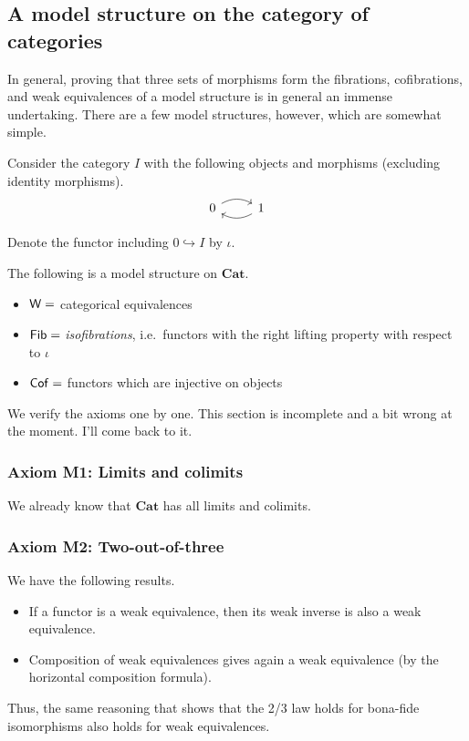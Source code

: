 \documentclass[main.tex]{subfiles}
\begin{document}
\subsection{A model structure on the category of categories}
\label{ssc:a_model_structure_on_the_category_of_categories}

In general, proving that three sets of morphisms form the fibrations, cofibrations, and weak equivalences of a model structure is in general an immense undertaking. There are a few model structures, however, which are somewhat simple.

Consider the category $I$ with the following objects and morphisms (excluding identity morphisms).
\begin{equation*}
  \begin{tikzcd}
    0
    \arrow[r, bend left]
    & 1
    \arrow[l, bend left]
  \end{tikzcd}
\end{equation*}

Denote the functor including $0 \hookrightarrow I$ by $\iota$.

The following is a model structure on $\mathbf{Cat}$.
\begin{itemize}
  \item $\mathsf{W} =$ categorical equivalences

  \item $\mathsf{Fib} =$ \emph{isofibrations}, i.e.\ functors with the right lifting property with respect to $\iota$

  \item $\mathsf{Cof} =$ functors which are injective on objects
\end{itemize}

We verify the axioms one by one. This section is incomplete and a bit wrong at the moment. I'll come back to it.
\subsubsection{Axiom M1: Limits and colimits}

We already know that $\mathbf{Cat}$ has all limits and colimits.

\subsubsection{Axiom M2: Two-out-of-three}

We have the following results.
\begin{itemize}
  \item If a functor is a weak equivalence, then its weak inverse is also a weak equivalence.

  \item Composition of weak equivalences gives again a weak equivalence (by the horizontal composition formula).
\end{itemize}
Thus, the same reasoning that shows that the 2/3 law holds for bona-fide isomorphisms also holds for weak equivalences.
\end{document}
